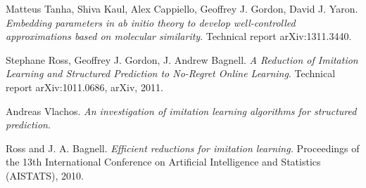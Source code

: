 \documentclass[twoside]{article}
\begin{document}
\begin{thebibliography}{9}
  Matteus Tanha, Shiva Kaul, Alex Cappiello, Geoffrey J. Gordon, David J. Yaron.
  \emph{Embedding parameters in ab initio theory to develop well-controlled approximations based on molecular similarity}.
  Technical report arXiv:1311.3440.
  
  Stephane Ross, Geoffrey J. Gordon, J. Andrew Bagnell.
  \emph{A Reduction of Imitation Learning and Structured Prediction to No-Regret Online Learning}.
  Technical report arXiv:1011.0686, arXiv, 2011.
  
  Andreas Vlachos.
  \emph{An investigation of imitation learning algorithms for structured prediction}.
  
    Ross and J. A. Bagnell.
  \emph{Efficient reductions for imitation
learning.} Proceedings of the 13th International
Conference on Artificial Intelligence and Statistics (AISTATS),
2010.
  
\end{thebibliography}
\end{document}
